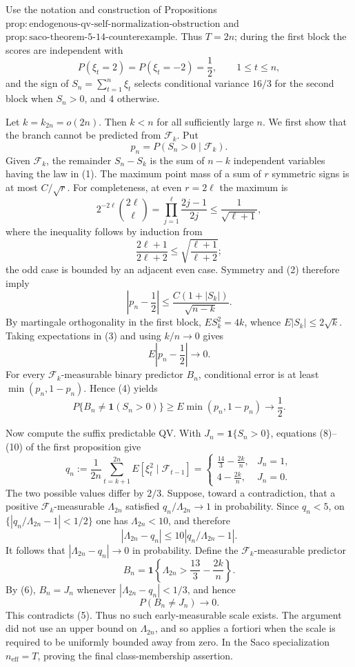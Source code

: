 Use the notation and construction of Propositions~\(\mathrm{prop:endogenous\text{-}qv\text{-}self\text{-}normalization\text{-}obstruction}\) and \(\mathrm{prop:saco\text{-}theorem\text{-}5\text{-}14\text{-}counterexample}\).  Thus \(T=2n\); during the first block the scores are independent with
\[
P(\xi_t=2)=P(\xi_t=-2)=\frac12,\qquad 1\le t\le n,
\tag{1}
\]
and the sign of \(S_n=\sum_{t=1}^n\xi_t\) selects conditional variance \(16/3\) for the second block when \(S_n>0\), and \(4\) otherwise.

Let \(k=k_{2n}=o(2n)\).  Then \(k<n\) for all sufficiently large \(n\).  We first show that the branch cannot be predicted from \(\mathcal F_k\).  Put
\[
p_n=P(S_n>0\mid\mathcal F_k).
\]
Given \(\mathcal F_k\), the remainder \(S_n-S_k\) is the sum of \(n-k\) independent variables having the law in (1).  The maximum point mass of a sum of \(r\) symmetric signs is at most \(C/\sqrt r\).  For completeness, at even \(r=2\ell\) the maximum is
\[
2^{-2\ell}\binom{2\ell}{\ell}=\prod_{j=1}^{\ell}\frac{2j-1}{2j}\le\frac1{\sqrt{\ell+1}},
\tag{2}
\]
where the inequality follows by induction from
\[
\frac{2\ell+1}{2\ell+2}\le\sqrt{\frac{\ell+1}{\ell+2}};
\]
the odd case is bounded by an adjacent even case.  Symmetry and (2) therefore imply
\[
\left|p_n-\frac12\right|\le\frac{C(1+|S_k|)}{\sqrt{n-k}}.
\tag{3}
\]
By martingale orthogonality in the first block, \(E S_k^2=4k\), whence \(E|S_k|\le2\sqrt k\).  Taking expectations in (3) and using \(k/n\to0\) gives
\[
E\left|p_n-\frac12\right|\longrightarrow0.
\tag{4}
\]
For every \(\mathcal F_k\)-measurable binary predictor \(B_n\), conditional error is at least \(\min(p_n,1-p_n)\).  Hence (4) yields
\[
P\{B_n\ne\mathbf1(S_n>0)\}\ge E\min(p_n,1-p_n)\longrightarrow\frac12.
\tag{5}
\]

Now compute the suffix predictable QV.  With \(J_n=\mathbf1\{S_n>0\}\), equations (8)--(10) of the first proposition give
\[
q_n:=\frac1{2n}\sum_{t=k+1}^{2n}E[\xi_t^2\mid\mathcal F_{t-1}]
=\begin{cases}
\displaystyle\frac{14}{3}-\frac{2k}{n},&J_n=1,\\[4pt]
\displaystyle4-\frac{2k}{n},&J_n=0.
\end{cases}
\tag{6}
\]
The two possible values differ by \(2/3\).  Suppose, toward a contradiction, that a positive \(\mathcal F_k\)-measurable \(\Lambda_{2n}\) satisfied \(q_n/\Lambda_{2n}\to1\) in probability.  Since \(q_n<5\), on \(\{|q_n/\Lambda_{2n}-1|<1/2\}\) one has \(\Lambda_{2n}<10\), and therefore
\[
|\Lambda_{2n}-q_n|\le10|q_n/\Lambda_{2n}-1|.
\]
It follows that \(|\Lambda_{2n}-q_n|\to0\) in probability.  Define the \(\mathcal F_k\)-measurable predictor
\[
B_n=\mathbf1\left\{\Lambda_{2n}>\frac{13}{3}-\frac{2k}{n}\right\}.
\tag{7}
\]
By (6), \(B_n=J_n\) whenever \(|\Lambda_{2n}-q_n|<1/3\), and hence
\[
P(B_n\ne J_n)\longrightarrow0.
\tag{8}
\]
This contradicts (5).  Thus no such early-measurable scale exists.  The argument did not use an upper bound on \(\Lambda_{2n}\), and so applies a fortiori when the scale is required to be uniformly bounded away from zero.  In the Saco specialization \(n_{\mathrm{eff}}=T\), proving the final class-membership assertion.